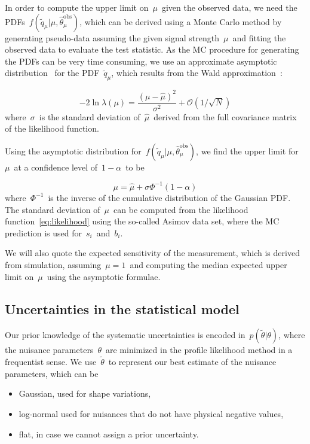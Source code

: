 In order to compute the upper limit on~$\mu$~given the observed data, we need the PDFs~$f(\tilde{q}_\mu | \mu, \hat{\theta}_\mu^{\mathrm{obs}})$, which can be derived using a Monte Carlo method by generating pseudo-data assuming the given signal strength~$\mu$~and fitting the observed data to evaluate the test statistic. As the MC procedure for generating the PDFs can be very time consuming, we use an approximate asymptotic distribution~\cite{Cowan:2010js} for the PDF~$\tilde{q}_\mu$, which results from the Wald approximation~\cite{wald1943tests}:

\begin{equation}
-2 \ln{\lambda(\mu)} = \frac{(\mu - \hat{\mu})^2}{\sigma^2}+ \mathcal{O}(1/\sqrt{N})
\end{equation}
where~$\sigma$~is the standard deviation of~$\hat{\mu}$~derived from the full covariance matrix of the likelihood function.

Using the asymptotic distribution for~$f(\tilde{q}_\mu | \mu, \hat{\theta}_\mu^{\mathrm{obs}})$, we find the upper limit for~$\mu$~at a confidence level of~$1 - \alpha$~to be

\begin{equation}
\mu = \hat{\mu} + \sigma \Phi^{-1}(1 - \alpha)
\end{equation}
where~$\Phi^{-1}$~is the inverse of the cumulative distribution of the Gaussian PDF. The standard deviation of~$\mu$~can be computed from the likelihood function~\cref{eq:likelihood} using the so-called Asimov data set, where the MC prediction is used for~$s_i$~and~$b_i$.

We will also quote the expected sensitivity of the measurement, which is derived from simulation, assuming~$\mu = 1$~and computing the median expected upper limit on~$\mu$~using the asymptotic formulae. 

\subsection{Uncertainties in the statistical model}

Our prior knowledge of the systematic uncertainties is encoded in~$p(\tilde{\theta} | \theta)$, where the nuisance parameters~$\theta$~are minimized in the profile likelihood method in a frequentist sense. We use~$\tilde{\theta}$~to represent our best estimate of the nuisance parameters, which can be
\begin{itemize}
\item Gaussian, used for shape variations,
\item log-normal used for nuisances that do not have physical negative values,
\item flat, in case we cannot assign a prior uncertainty.
\end{itemize}


